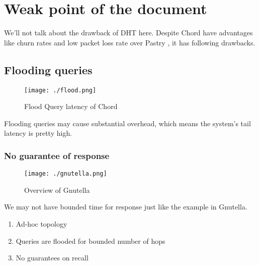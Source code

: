 \documentclass[acmlarge]{acmart}
\begin{document}
\section{Weak point of the document}

We'll not talk about the drawback of DHT here. Despite Chord have advantages like churn rates and low packet loss rate over Pastry \cite{rowstron2001pastry}, it has following drawbacks.
\subsection{Flooding queries}
\begin{figure}[htbp]
  \centering
  \texttt{[image: ./flood.png]}
  \caption{Flood Query latency of Chord \cite{lua2005survey}}
\end{figure}

Flooding queries may cause substantial overhead, which means the system's tail latency is pretty high.
\subsubsection{No guarantee of response}
\begin{figure}[htbp]
  \centering
  \texttt{[image: ./gnutella.png]}
  \caption{Overview of Gnutella \cite{cmu}}
\end{figure}

We may not have bounded time for response just like the example in Gnutella.
\begin{enumerate}
  \item Ad-hoc topology
  \item Queries are flooded for bounded number of hops
  \item No guarantees on recall
\end{enumerate}
\end{document}
